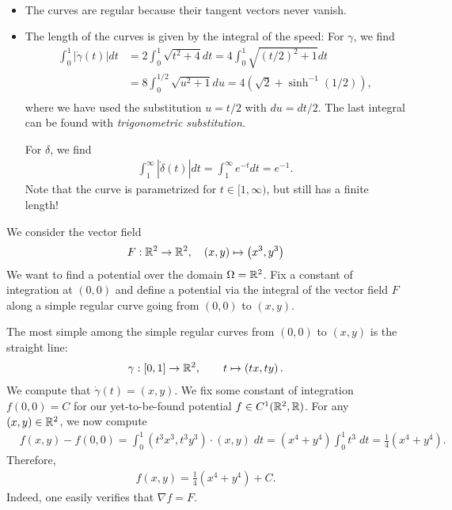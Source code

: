 \documentclass[11pt]{article}
\begin{document}
\begin{solution}
\begin{itemize}
\begin{align}
        \end{align}
        \item The curves are regular because their tangent vectors never vanish.
        \item The length of the curves is given by the integral of the speed: For $\gamma$, we find
        \begin{align}
            \int_0^1 |\dot \gamma(t)| dt &= 2 \int_0^1 \sqrt{t^2 + 4} dt = 4 \int_{0}^1 \sqrt{(t/2)^2 + 1} dt\\
            &= 8 \int_0^{1/2} \sqrt{u^2 + 1} du =  4(\sqrt{2} + \sinh^{-1}(1/2)),\\
        \end{align}
        where we have used the substitution $u = t/2$ with $du = dt/2$. The last integral can be found with \emph{trigonometric substitution}.
        
        For $\delta$, we find
        \begin{align}
            \int_1^\infty |\dot \delta(t)| dt = \int_1^\infty e^{-t} dt = e^{-1}.
        \end{align}
        Note that the curve is parametrized for $t \in [1,\infty)$, but still has a finite length!
    \end{itemize}
\end{solution}



\begin{exercise}
	We consider the vector field 
	\[
		F : \mathbb{R}^2 \rightarrow \mathbb{R}^2, \quad (x,y) \mapsto \left( x^3, y^3 \right)
	\]
	We want to find a potential over the domain $\Omega = \mathbb{R}^{2}$. 
	Fix a constant of integration at $(0,0)$ and define a potential via the integral of the vector field $F$ 
	along a simple regular curve going from $(0,0)$ to $(x,y)$.
\end{exercise}
\begin{solution}
	The most simple among the simple regular curves from $(0,0)$ to $(x,y)$ is the straight line:
	\begin{gather*}
        \gamma : [0,1] \rightarrow \mathbb{R}^{2}, \qquad t \mapsto \left( tx, ty \right).
    \end{gather*}
	We compute that $\dot\gamma(t) = (x,y)$. 
	We fix some constant of integration $f(0,0) = C$ for our yet-to-be-found potential $f \in C^1(\mathbb{R}^2,\mathbb{R})$.
	For any $(x,y) \in \mathbb{R}^2$, we now compute 
    \begin{align}
        &
        f(x,y) - f(0,0)
		=
		\int_{0}^{1} \left( t^{3}x^3, t^{3}y^{3} \right) \cdot \left( x,y \right) \;dt
        =
        \left( x^{4} + y^{4} \right) \int_{0}^{1} t^{3} \;dt
        =
        \frac 1 4 \left( x^{4} + y^{4} \right) 
        .
    \end{align}
	Therefore,
	\begin{align}
        f(x,y) = \frac 1 4 \left( x^{4} + y^{4} \right) + C
		.
    \end{align}
	Indeed, one easily verifies that $\nabla f = F$.
\end{solution}
\end{document}
